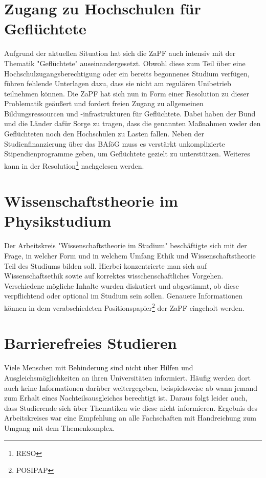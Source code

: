 \section*{Zugang zu Hochschulen für Geflüchtete}
Aufgrund der aktuellen Situation hat sich die ZaPF auch intensiv mit der Thematik "Geflüchtete" auseinandergesetzt. Obwohl diese zum Teil über eine Hochschulzugangsberechtigung oder ein bereits begonnenes Studium verfügen, führen fehlende Unterlagen dazu, dass sie nicht am regulären Unibetrieb teilnehmen können. Die ZaPF hat sich nun in Form einer Resolution zu dieser Problematik geäußert und fordert freien Zugang zu allgemeinen Bildungsressourcen und -infrastrukturen für Geflüchtete. Dabei haben der Bund und die Länder dafür Sorge zu tragen, dass die genannten Maßnahmen weder den Geflüchteten noch den Hochschulen zu Lasten fallen. Neben der Studienfinanzierung über das BAföG muss es verstärkt unkomplizierte Stipendienprogramme geben, um Geflüchtete gezielt zu unterstützen. Weiteres kann in der Resolution\footnote{RESO} nachgelesen werden.

\section*{Wissenschaftstheorie im Physikstudium}
Der  Arbeitskreis "Wissenschaftstheorie im Studium" beschäftigte sich mit der Frage, in welcher Form und in welchem Umfang Ethik und Wissenschaftstheorie Teil des Studiums bilden soll. Hierbei konzentrierte man sich auf Wissenschaftsethik sowie auf korrektes wisschenschaftliches Vorgehen. Verschiedene mögliche Inhalte wurden diskutiert und abgestimmt, ob diese verpflichtend oder optional im Studium sein sollen. Genauere Informationen können in dem verabschiedeten Positionspapier\footnote{POSIPAP} der ZaPF eingeholt werden.

\section*{Barrierefreies Studieren}
Viele Menschen mit Behinderung sind nicht über Hilfen und Ausgleichsmöglichkeiten an ihren Universitäten informiert. Häufig werden dort auch keine Informationen darüber weitergegeben, beispielsweise ab wann jemand zum Erhalt eines Nachteilsausgleiches berechtigt ist. Daraus folgt leider auch, dass Studierende sich über Thematiken wie diese nicht informieren.
Ergebnis des Arbeitskreises war eine Empfehlung an alle Fachschaften mit Handreichung zum Umgang mit dem Themenkomplex.

